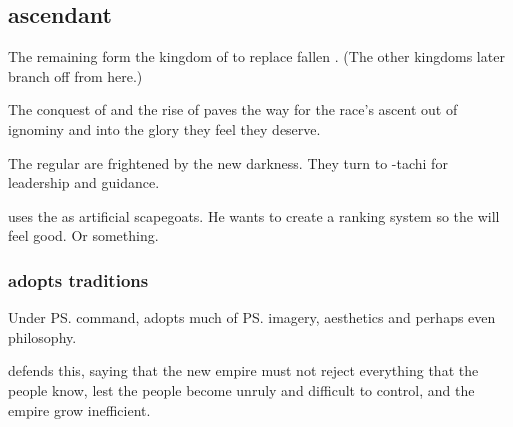 \subsection{\KiriathSepher{} ascendant}
The remaining \resphain{} form the kingdom of \KiriathSepher{} to replace fallen \Merkyrah{}. (The other \resphan{} kingdoms later branch off from here.)

The conquest of \Merkyrah{} and the rise of \KiriathSepher{} paves the way for the \resphan{} race's ascent out of ignominy and into the glory they feel they deserve. 


The regular \resphain{} are frightened by the new darkness. 
They turn to \Azraid-tachi for leadership and guidance. 


\Azraid{} uses the \ashenblooded{} as artificial scapegoats. 
He wants to create a ranking system so the \resphain{} will feel good. 
Or something. 






\subsubsection{\KiriathSepher{} adopts \Merkyran{} traditions}
Under \ps{\Azraid}{} command, \KiriathSepher{} adopts much of \ps{\Merkyrah}{} imagery, aesthetics and perhaps even philosophy. 

\Azraid{} defends this, saying that the new empire must not reject everything that the people know, lest the people become unruly and difficult to control, and the empire grow inefficient.


